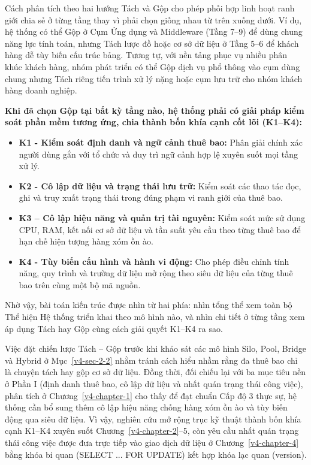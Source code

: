 Cách phân tích theo hai hướng Tách và Gộp cho phép phối hợp linh hoạt ranh giới chia sẻ ở từng tầng thay vì phải chọn giống nhau từ trên xuống dưới. Ví dụ, hệ thống có thể Gộp ở Cụm Ứng dụng và Middleware (Tầng 7--9) để dùng chung năng lực tính toán, nhưng Tách lược đồ hoặc cơ sở dữ liệu ở Tầng 5--6 để khách hàng dễ tùy biến cấu trúc bảng. Tương tự, với nền tảng phục vụ nhiều phân khúc khách hàng, nhóm phát triển có thể Gộp dịch vụ phổ thông vào cụm dùng chung nhưng Tách riêng tiến trình xử lý nặng hoặc cụm lưu trữ cho nhóm khách hàng doanh nghiệp.

\textbf{Khi đã chọn Gộp tại bất kỳ tầng nào, hệ thống phải có giải pháp kiểm soát phần mềm tương ứng, chia thành bốn khía cạnh cốt lõi (K1--K4):}

\begin{itemize}
\item
  \textbf{K1 - Kiểm soát định danh và ngữ cảnh thuê bao:} Phân giải chính xác người dùng gắn với tổ chức và duy trì ngữ cảnh hợp lệ xuyên suốt mọi tầng xử lý.
\item
  \textbf{K2 - Cô lập dữ liệu và trạng thái lưu trữ:} Kiểm soát các thao tác đọc, ghi và truy xuất trạng thái trong đúng phạm vi ranh giới của thuê bao.
\item
  \textbf{K3 -- Cô lập hiệu năng và quản trị tài nguyên:} Kiểm soát mức sử dụng CPU, RAM, kết nối cơ sở dữ liệu và tần suất yêu cầu theo từng thuê bao để hạn chế hiện tượng hàng xóm ồn ào.
\item
  \textbf{K4 - Tùy biến cấu hình và hành vi động:} Cho phép điều chỉnh tính năng, quy trình và trường dữ liệu mở rộng theo siêu dữ liệu của từng thuê bao trên cùng một bộ mã nguồn.
\end{itemize}

Nhờ vậy, bài toán kiến trúc được nhìn từ hai phía: nhìn tổng thể xem toàn bộ Thể hiện Hệ thống triển khai theo mô hình nào, và nhìn chi tiết ở từng tầng xem áp dụng Tách hay Gộp cùng cách giải quyết K1--K4 ra sao.

Việc đặt chiến lược Tách -- Gộp trước khi khảo sát các mô hình Silo, Pool, Bridge và Hybrid ở Mục~\ref{v4-sec-2-2} nhằm tránh cách hiểu nhầm rằng đa thuê bao chỉ là chuyện tách hay gộp cơ sở dữ liệu. Đồng thời, đối chiếu lại với ba mục tiêu nền ở Phần I (định danh thuê bao, cô lập dữ liệu và nhất quán trạng thái công việc), phân tích ở Chương~\ref{v4-chapter-1} cho thấy để đạt chuẩn Cấp độ 3 thực sự, hệ thống cần bổ sung thêm cô lập hiệu năng chống hàng xóm ồn ào và tùy biến động qua siêu dữ liệu. Vì vậy, nghiên cứu mở rộng trục kỹ thuật thành bốn khía cạnh K1--K4 xuyên suốt Chương~\ref{v4-chapter-2}--5, còn yêu cầu nhất quán trạng thái công việc được đưa trực tiếp vào giao dịch dữ liệu ở Chương~\ref{v4-chapter-4} bằng khóa bi quan (SELECT ... FOR UPDATE) kết hợp khóa lạc quan (version).

